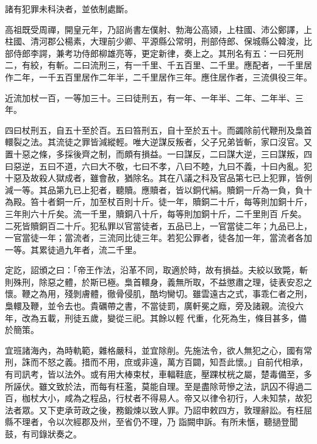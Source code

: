 \begin{pinyinscope}
 諸有犯罪未科決者，並依制處斷。



 高祖既受周禪，開皇元年，乃詔尚書左僕射、勃海公高熲，上柱國、沛公鄭譯，上柱國、清河郡公楊素，大理前少卿、平源縣公常明，刑部侍郎、保城縣公韓浚，比部侍郎李諤，兼考功侍郎柳雄亮等，更定新律，奏上之。其刑名有五：一曰死刑二，有絞，有斬。二曰流刑三，有一千里、千五百里、二千里。應配者，一千里居作二年，一千五百里居作二年半，二千里居作三年。應住居作者，三流俱役三年。



 近流加杖一百，一等加三十。三曰徒刑五，有一年、一年半、二年、二年半、三年。



 四曰杖刑五，自五十至於百。五曰笞刑五，自十至於五十。而蠲除前代鞭刑及梟首
 轘裂之法。其流徒之罪皆減縱輕。唯大逆謀反叛者，父子兄弟皆斬，家口沒官。又置十惡之條，多採後齊之制，而頗有損益。一曰謀反，二曰謀大逆，三曰謀叛，四曰惡逆，五曰不道，六曰大不敬，七曰不孝，八曰不睦，九曰不義，十曰內亂。犯十惡及故殺人獄成者，雖會赦，猶除名。其在八議之科及官品第七已上犯罪，皆例減一等。其品第九已上犯者，聽贖。應贖者，皆以銅代絹。贖銅一斤為一負，負十為殿。笞十者銅一斤，加至杖百則十斤。徒一年，贖銅二十斤，每等則加銅十斤，三年則六十斤矣。流一千里，贖銅八十斤，每等則加銅十斤，二千里則百
 斤矣。二死皆贖銅百二十斤。犯私罪以官當徒者，五品已上，一官當徒二年；九品已上，一官當徒一年；當流者，三流同比徒三年。若犯公罪者，徒各加一年，當流者各加一等。其累徒過九年者，流二千里。



 定訖，詔頒之曰：「帝王作法，沿革不同，取適於時，故有損益。夫絞以致斃，斬則殊刑，除惡之體，於斯已極。梟首轘身，義無所取，不益懲肅之理，徒表安忍之懷。鞭之為用，殘剝膚體，徹骨侵肌，酷均臠切。雖雲遠古之式，事乖仁者之刑，梟轘及鞭，並令去也。貴礪帶之書，不當徒罰，廣軒冕之廕，旁及諸親。流役六年，改為五載，刑徒五歲，變從三祀。其餘以輕
 代重，化死為生，條目甚多，備於簡策。



 宜班諸海內，為時軌範，雜格嚴科，並宜除削。先施法令，欲人無犯之心，國有常刑，誅而不怒之義。措而不用，庶或非遠，萬方百闢，知吾此懷。」自前代相承，有司訊考，皆以法外。或有用大棒束杖，車輻鞋底，壓踝杖桄之屬，楚毒備至，多所誣伏。雖文致於法，而每有枉濫，莫能自理。至是盡除苛慘之法，訊囚不得過二百，枷杖大小，咸為之程品，行杖者不得易人。帝又以律令初行，人未知禁，故犯法者眾。又下吏承苛政之後，務鍛煉以致人罪。乃詔申敕四方，敦理辭訟。有枉屈縣不理者，令以次經郡及州，至省仍不理，乃
 詣闕申訴。有所未愜，聽撾登聞鼓，有司錄狀奏之。




\end{pinyinscope}
